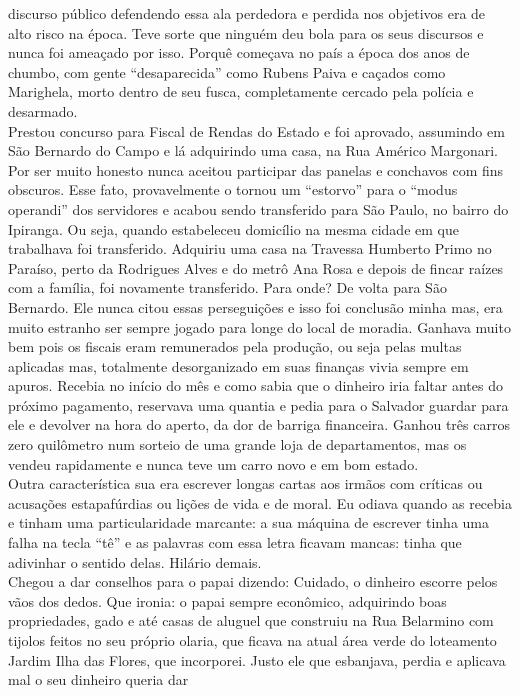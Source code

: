 \documentclass[12pt,brazil,]{book}
\begin{document}
discurso público defendendo essa ala perdedora e perdida nos objetivos
era de alto risco na época. Teve sorte que ninguém deu bola para os seus
discursos e nunca foi ameaçado por isso. Porquê começava no país a época
dos anos de chumbo, com gente ``desaparecida'' como Rubens Paiva e
caçados como Marighela, morto dentro de seu fusca, completamente cercado
pela polícia e desarmado.\\
Prestou concurso para Fiscal de Rendas do Estado e foi aprovado,
assumindo em São Bernardo do Campo e lá adquirindo uma casa, na Rua
Américo Margonari. Por ser muito honesto nunca aceitou participar das
panelas e conchavos com fins obscuros. Esse fato, provavelmente o tornou
um ``estorvo'' para o ``modus operandi'' dos servidores e acabou sendo
transferido para São Paulo, no bairro do Ipiranga. Ou seja, quando
estabeleceu domicílio na mesma cidade em que trabalhava foi transferido.
Adquiriu uma casa na Travessa Humberto Primo no Paraíso, perto da
Rodrigues Alves e do metrô Ana Rosa e depois de fincar raízes com a
família, foi novamente transferido. Para onde? De volta para São
Bernardo. Ele nunca citou essas perseguições e isso foi conclusão minha
mas, era muito estranho ser sempre jogado para longe do local de
moradia. Ganhava muito bem pois os fiscais eram remunerados pela
produção, ou seja pelas multas aplicadas mas, totalmente desorganizado
em suas finanças vivia sempre em apuros. Recebia no início do mês e como
sabia que o dinheiro iria faltar antes do próximo pagamento, reservava
uma quantia e pedia para o Salvador guardar para ele e devolver na hora
do aperto, da dor de barriga financeira. Ganhou três carros zero
quilômetro num sorteio de uma grande loja de departamentos, mas os
vendeu rapidamente e nunca teve um carro novo e em bom estado.\\
Outra característica sua era escrever longas cartas aos irmãos com
críticas ou acusações estapafúrdias ou lições de vida e de moral. Eu
odiava quando as recebia e tinham uma particularidade marcante: a sua
máquina de escrever tinha uma falha na tecla ``tê'' e as palavras com
essa letra ficavam mancas: tinha que adivinhar o sentido delas. Hilário
demais.\\
Chegou a dar conselhos para o papai dizendo: Cuidado, o dinheiro escorre
pelos vãos dos dedos. Que ironia: o papai sempre econômico, adquirindo
boas propriedades, gado e até casas de aluguel que construiu na Rua
Belarmino com tijolos feitos no seu próprio olaria, que ficava na atual
área verde do loteamento Jardim Ilha das Flores, que incorporei. Justo
ele que esbanjava, perdia e aplicava mal o seu dinheiro queria dar
\end{document}

